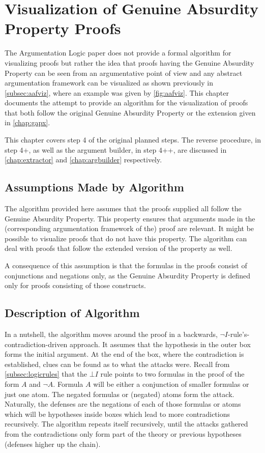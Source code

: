 \documentclass[11pt,twoside,a4paper]{report}
\begin{document}
\chapter{Visualization of Genuine Absurdity Property Proofs}
\label{chap:viz}
The Argumentation Logic paper does not provide a formal algorithm for visualizing proofs but rather the idea that proofs having the Genuine Absurdity Property can be seen from an argumentative point of view and any abstract argumentation framework can be visualized as shown previously in \autoref{subsec:aafviz}, where an example was given by \autoref{fig:aafviz}. This chapter documents the attempt to provide an algorithm for the visualization of proofs that both follow the original Genuine Absurdity Property or the extension given in \autoref{chap:gapx}. 

This chapter covers step 4 of the original planned steps. The reverse procedure, in step 4+, as well as the argument builder, in step 4++, are discussed in \autoref{chap:extractor} and \autoref{chap:argbuilder} respectively.

\section{Assumptions Made by Algorithm}
The algorithm provided here assumes that the proofs supplied all follow the Genuine Absurdity Property. This property ensures that arguments made in the (corresponding argumentation framework of the) proof are relevant. It might be possible to visualize proofs that do not have this property. The algorithm can deal with proofs that follow the extended version of the property as well.

A consequence of this assumption is that the formulas in the proofs consist of conjunctions and negations only, as the Genuine Absurdity Property is defined only for proofs consisting of those constructs.

\section{Description of Algorithm}
\label{sec:vizalg}
In a nutshell, the algorithm moves around the proof in a backwards, $\neg I$-rule's-contradiction-driven approach. It assumes that the hypothesis in the outer box forms the initial argument. At the end of the box, where the contradiction is established, clues can be found as to what the attacks were. Recall from \autoref{subsec:logicrules} that the $\bot I$ rule points to two formulas in the proof of the form $A$ and $\neg A$. Formula $A$ will be either a conjunction of smaller formulas or just one atom. The negated formulas or (negated) atoms form the attack. Naturally, the defenses are the negations of each of those formulas or atoms which will be hypotheses inside boxes which lead to more contradictions recursively. The algorithm repeats itself recursively, until the attacks gathered from the contradictions only form part of the theory or previous hypotheses (defenses higher up the chain).
\end{document}

